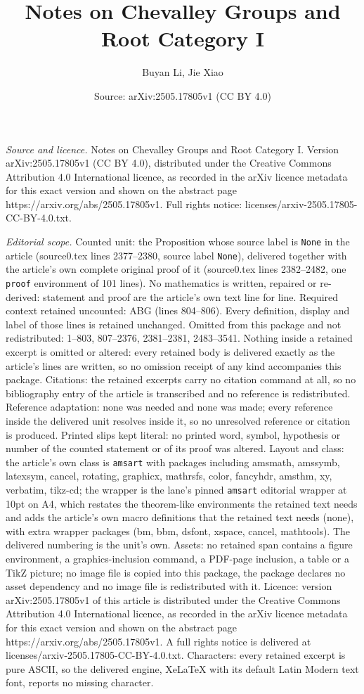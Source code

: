 \documentclass[10pt,a4paper]{amsart}
\title[Notes on Chevalley Groups and Root Category I]{Notes on Chevalley Groups and Root Category I}
\author{Buyan Li, Jie Xiao}
\date{Source: arXiv:2505.17805v1 (CC BY 4.0)}
\begin{document}
\maketitle

\noindent\emph{Source and licence.} Notes on Chevalley Groups and Root Category I. Version arXiv:2505.17805v1 (CC BY 4.0), distributed under the Creative Commons Attribution 4.0 International licence, as recorded in the arXiv licence metadata for this exact version and shown on the abstract page https://arxiv.org/abs/2505.17805v1. Full rights notice: licenses/arxiv-2505.17805-CC-BY-4.0.txt.\par\smallskip

\noindent\textit{Editorial scope.} Counted unit: the Proposition whose source label is \texttt{None} in the article (source0.tex lines 2377--2380, source label \texttt{None}), delivered together with the article's own complete original proof of it (source0.tex lines 2382--2482, one \texttt{proof} environment of 101 lines). No mathematics is written, repaired or re-derived: statement and proof are the article's own text line for line. Required context retained uncounted: ABG (lines 804--806). Every definition, display and label of those lines is retained unchanged. Omitted from this package and not redistributed: 1--803, 807--2376, 2381--2381, 2483--3541. Nothing inside a retained excerpt is omitted or altered: every retained body is delivered exactly as the article's lines are written, so no omission receipt of any kind accompanies this package. Citations: the retained excerpts carry no citation command at all, so no bibliography entry of the article is transcribed and no reference is redistributed. Reference adaptation: none was needed and none was made; every reference inside the delivered unit resolves inside it, so no unresolved reference or citation is produced. Printed slips kept literal: no printed word, symbol, hypothesis or number of the counted statement or of its proof was altered. Layout and class: the article's own class is \texttt{amsart} with packages including amsmath, amssymb, latexsym, cancel, rotating, graphicx, mathrsfs, color, fancyhdr, amsthm, xy, verbatim, tikz-cd; the wrapper is the lane's pinned \texttt{amsart} editorial wrapper at 10pt on A4, which restates the theorem-like environments the retained text needs and adds the article's own macro definitions that the retained text needs (none), with extra wrapper packages (bm, bbm, dsfont, xspace, cancel, mathtools). The delivered numbering is the unit's own. Assets: no retained span contains a figure environment, a graphics-inclusion command, a PDF-page inclusion, a table or a TikZ picture; no image file is copied into this package, the package declares no asset dependency and no image file is redistributed with it. Licence: version arXiv:2505.17805v1 of this article is distributed under the Creative Commons Attribution 4.0 International licence, as recorded in the arXiv licence metadata for this exact version and shown on the abstract page https://arxiv.org/abs/2505.17805v1. A full rights notice is delivered at licenses/arxiv-2505.17805-CC-BY-4.0.txt. Characters: every retained excerpt is pure ASCII, so the delivered engine, XeLaTeX with its default Latin Modern text font, reports no missing character.
\end{document}
